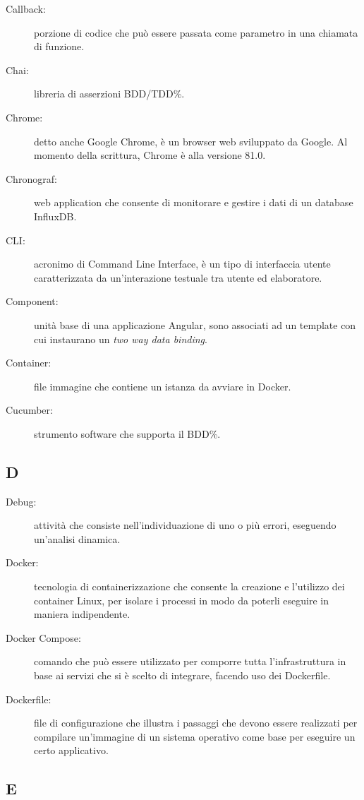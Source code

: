 \documentclass[../manuale-manutentore.tex]{subfiles}
\begin{document}
\begin{description}
    \item[Callback:] porzione di codice che può essere passata come parametro in una chiamata di funzione.
    \item[Chai:] libreria di asserzioni BDD/TDD\%.
    \item[Chrome:] detto anche Google Chrome, è un browser web sviluppato da Google. Al momento della scrittura, Chrome è alla versione 81.0.
    \item[Chronograf:] web application che consente di monitorare e gestire i dati di un database InfluxDB\@.
    \item[CLI:] acronimo di Command Line Interface, è un tipo di interfaccia utente caratterizzata da un'interazione testuale tra utente ed elaboratore.
    \item[Component:] unità base di una applicazione Angular, sono associati ad un template con cui instaurano un \textit{two way data binding}.
    \item[Container:] file immagine che contiene un istanza da avviare in Docker.
    \item[Cucumber:] strumento software che supporta il BDD\%.
\end{description}

\subsection{D}

\begin{description}
    \item[Debug:] attività che consiste nell'individuazione di uno o più errori, eseguendo un'analisi dinamica.
    \item[Docker:] tecnologia di containerizzazione che consente la creazione e l'utilizzo dei container Linux, per isolare i processi in modo da poterli eseguire in maniera indipendente.
    \item[Docker Compose:] comando che può essere utilizzato per comporre tutta l'infrastruttura in base ai servizi che si è scelto di integrare, facendo uso dei Dockerfile.
    \item[Dockerfile:] file di configurazione che illustra i passaggi che devono essere realizzati per compilare un'immagine di un sistema operativo come base per eseguire un certo applicativo.
\end{description}

\subsection{E}
\end{document}
